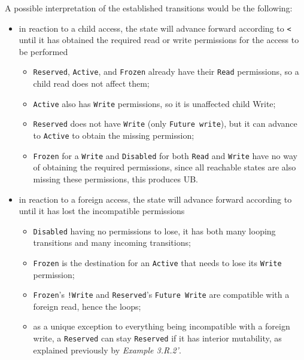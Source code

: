 \documentclass[a4paper,11pt]{article}
\theoremstyle{plain}
\theoremstyle{definition}
\theoremstyle{remark}
\newcommand{\tcode}[1]{\rstinline{#1}}
\newcommand{\tperm}[1]{\texttt{#1}}
\begin{document}
A possible interpretation of the established transitions would be the following:
\begin{itemize}
    \item in reaction to a child access, the state will advance forward according to \tperm{<} until
        it has obtained the required read or write permissions for the access to be performed
        \begin{itemize}
            \item \tperm{Reserved}, \tperm{Active}, and \tperm{Frozen} already have their \tperm{Read} permissions,
                so a child read does not affect them;
            \item \tperm{Active} also has \tperm{Write} permissions, so it is unaffected child Write;
            \item \tperm{Reserved} does not have \tperm{Write} (only \tperm{Future write}), but it can advance to \tperm{Active} to
                obtain the missing permission;
            \item \tperm{Frozen} for a \tperm{Write} and \tperm{Disabled} for both \tperm{Read} and \tperm{Write} have no way of
                obtaining the required permissions, since all reachable states are also missing these
                permissions, this produces UB.
        \end{itemize}
    \item in reaction to a foreign access, the state will advance forward according to \tcode{<} until
        it has lost the incompatible permissions
        \begin{itemize}
            \item \tperm{Disabled} having no permissions to lose, it has both many looping transitions and many incoming transitions;
            \item \tperm{Frozen} is the destination for an \tperm{Active} that needs to lose its \tperm{Write} permission;
            \item \tperm{Frozen}'s \tperm{!Write} and \tperm{Reserved}'s \tperm{Future Write} are compatible with a foreign read, hence the loops;
            \item as a unique exception to everything being incompatible with a foreign write, a \tperm{Reserved} can stay
                \tperm{Reserved} if it has interior mutability, as explained previously by \textit{Example 3.R.2'}.
        \end{itemize}
\end{itemize}
\end{document}
